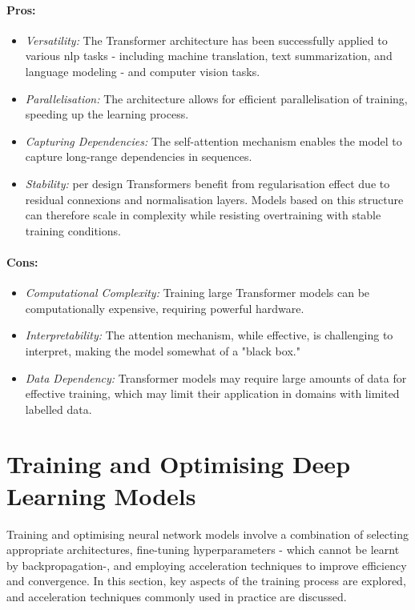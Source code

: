 \paragraph{Pros:}
\begin{itemize}
    \item \textit{Versatility:} The Transformer architecture has been successfully applied to various \gls{nlp} tasks - including machine translation, text summarization, and language modeling - and computer vision tasks.
    \item \textit{Parallelisation:} The architecture allows for efficient parallelisation of training, speeding up the learning process.
    \item \textit{Capturing Dependencies:} The self-attention mechanism enables the model to capture long-range dependencies in sequences.
    \item \textit{Stability:} per design Transformers benefit from regularisation effect due to residual connexions and normalisation layers. Models based on this structure can therefore scale in complexity while resisting overtraining with stable training conditions.
\end{itemize}

\paragraph{Cons:}
\begin{itemize}
    \item \textit{Computational Complexity:} Training large Transformer models can be computationally expensive, requiring powerful hardware.
    \item \textit{Interpretability:} The attention mechanism, while effective, is challenging to interpret, making the model somewhat of a "black box."
    \item \textit{Data Dependency:} Transformer models may require large amounts of data for effective training, which may limit their application in domains with limited labelled data.
\end{itemize}

\section{Training and Optimising Deep Learning Models}
Training and optimising neural network models involve a combination of selecting appropriate architectures, fine-tuning hyperparameters - which cannot be learnt by backpropagation-, and employing acceleration techniques to improve efficiency and convergence. In this section, key aspects of the training process are explored, and acceleration techniques commonly used in practice are discussed.

